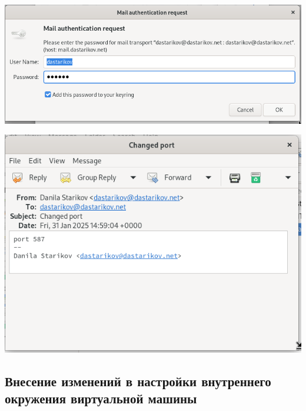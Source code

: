 \begin{enumerate}
\begin{center}
    \centering
    \includegraphics[width=\textwidth]{../images/image21.png}
    \label{21}
  \end{center}
  \begin{center}
    \centering
    \includegraphics[width=\textwidth]{../images/image22.png}
    \label{22}
\end{center}
\end{enumerate}

\subsection{Внесение изменений в настройки внутреннего окружения виртуальной машины}

